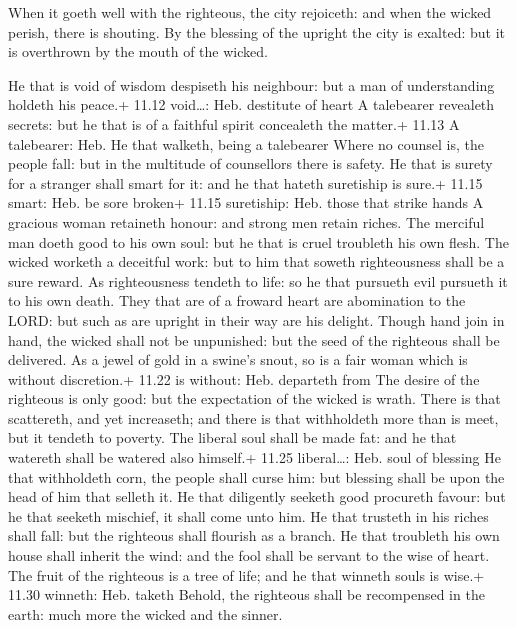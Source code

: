  When it goeth well with the righteous, the city rejoiceth:
and when the wicked perish, there is shouting.  By the
blessing of the upright the city is exalted: but it is overthrown by the
mouth of the wicked.

 He that is void of wisdom despiseth his neighbour: but a
man of understanding holdeth his peace.+ 11.12 void\ldots: Heb.
destitute of heart  A talebearer revealeth secrets: but he
that is of a faithful spirit concealeth the matter.+ 11.13 A talebearer:
Heb. He that walketh, being a talebearer  Where no counsel
is, the people fall: but in the multitude of counsellors there is
safety.  He that is surety for a stranger shall smart for
it: and he that hateth suretiship is sure.+ 11.15 smart: Heb. be sore
broken+ 11.15 suretiship: Heb. those that strike hands  A
gracious woman retaineth honour: and strong men retain riches.
 The merciful man doeth good to his own soul: but he that
is cruel troubleth his own flesh.  The wicked worketh a
deceitful work: but to him that soweth righteousness shall be a sure
reward.  As righteousness tendeth to life: so he that
pursueth evil pursueth it to his own death.  They that are
of a froward heart are abomination to the LORD: but such as are upright
in their way are his delight.  Though hand join in hand,
the wicked shall not be unpunished: but the seed of the righteous shall
be delivered.  As a jewel of gold in a swine's snout, so is
a fair woman which is without discretion.+ 11.22 is without: Heb.
departeth from  The desire of the righteous is only good:
but the expectation of the wicked is wrath.  There is that
scattereth, and yet increaseth; and there is that withholdeth more than
is meet, but it tendeth to poverty.  The liberal soul shall
be made fat: and he that watereth shall be watered also himself.+ 11.25
liberal\ldots: Heb. soul of blessing  He that withholdeth
corn, the people shall curse him: but blessing shall be upon the head of
him that selleth it.  He that diligently seeketh good
procureth favour: but he that seeketh mischief, it shall come unto him.
 He that trusteth in his riches shall fall: but the
righteous shall flourish as a branch.  He that troubleth
his own house shall inherit the wind: and the fool shall be servant to
the wise of heart.  The fruit of the righteous is a tree of
life; and he that winneth souls is wise.+ 11.30 winneth: Heb. taketh
 Behold, the righteous shall be recompensed in the earth:
much more the wicked and the sinner.

